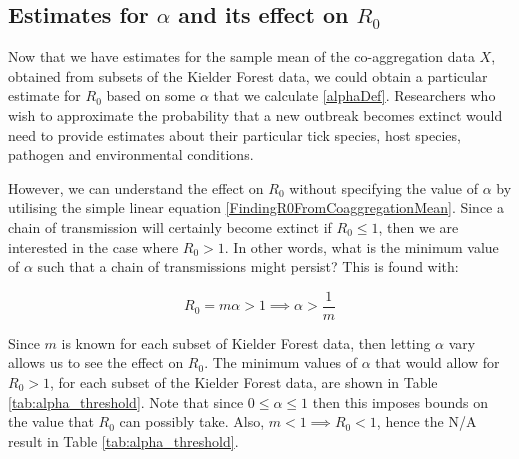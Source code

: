 \documentclass{article}
\begin{document}
\clearpage

\subsection{Estimates for \texorpdfstring{$ \alpha $}{alpha} and its effect on \texorpdfstring{$ R_0 $}{R0}}

Now that we have estimates for the sample mean of the co-aggregation data $ X $, obtained from subsets of the Kielder Forest data, we could obtain a particular estimate for $ R_0 $ based on some $ \alpha $ that we calculate \eqref{alphaDef}. Researchers who wish to approximate the probability that a new outbreak becomes extinct would need to provide estimates about their particular tick species, host species, pathogen and environmental conditions.

However, we can understand the effect on $ R_0 $ without specifying the value of $ \alpha $ by utilising the simple linear equation \eqref{FindingR0FromCoaggregationMean}. Since a chain of transmission will certainly become extinct if $ R_0 \le 1 $, then we are interested in the case where $ R_0 > 1 $. In other words, what is the minimum value of $ \alpha $ such that a chain of transmissions might persist? This is found with:

\begin{equation}
	R_0 = m\alpha > 1 \implies \alpha > \frac{1}{m} \nonumber
\end{equation}

Since $ m $ is known for each subset of Kielder Forest data, then letting $ \alpha $ vary allows us to see the effect on $ R_0 $. The minimum values of $ \alpha $ that would allow for $ R_0 > 1 $, for each subset of the Kielder Forest data, are shown in Table \ref{tab:alpha_threshold}. Note that since $ 0 \le \alpha \le 1 $ then this imposes bounds on the value that $ R_0 $ can possibly take. Also, $ m < 1 \implies R_0 < 1 $, hence the N/A result in Table \ref{tab:alpha_threshold}.
\end{document}

